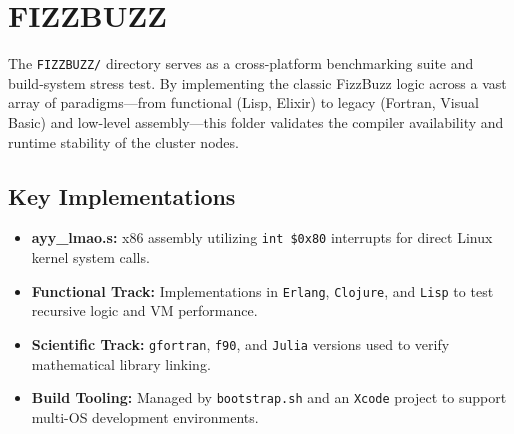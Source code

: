 \section{FIZZBUZZ}
The \texttt{FIZZBUZZ/} directory serves as a cross-platform benchmarking suite and build-system stress test. By implementing the classic FizzBuzz logic across a vast array of paradigms---from functional (Lisp, Elixir) to legacy (Fortran, Visual Basic) and low-level assembly---this folder validates the compiler availability and runtime stability of the cluster nodes.

\subsection*{Key Implementations}
\begin{itemize}
    \item \textbf{ayy\_lmao.s:} x86 assembly utilizing \texttt{int \$0x80} interrupts for direct Linux kernel system calls.
    \item \textbf{Functional Track:} Implementations in \texttt{Erlang}, \texttt{Clojure}, and \texttt{Lisp} to test recursive logic and VM performance.
    \item \textbf{Scientific Track:} \texttt{gfortran}, \texttt{f90}, and \texttt{Julia} versions used to verify mathematical library linking.
    \item \textbf{Build Tooling:} Managed by \texttt{bootstrap.sh} and an \texttt{Xcode} project to support multi-OS development environments.
\end{itemize}